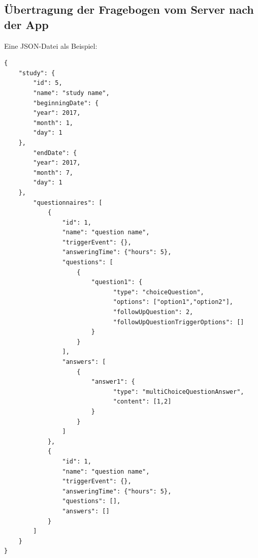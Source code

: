 \documentclass[a4paper]{scrreprt}
\begin{document}
            \subsection{Übertragung der Fragebogen vom Server nach der App}
                Eine JSON-Datei als Beispiel:
                \begin{lstlisting}
{
    "study": {
        "id": 5,
        "name": "study name",
        "beginningDate": {
        "year": 2017,
        "month": 1,
        "day": 1
    },
        "endDate": {
        "year": 2017,
        "month": 7,
        "day": 1
    },
        "questionnaires": [
            {
                "id": 1,
                "name": "question name",
                "triggerEvent": {},
                "answeringTime": {"hours": 5},
                "questions": [
                    {
                        "question1": {
                              "type": "choiceQuestion",
                              "options": ["option1","option2"],
                              "followUpQuestion": 2,
                              "followUpQuestionTriggerOptions": []
                        }
                    }
                ],
                "answers": [
                    {
                        "answer1": {
                              "type": "multiChoiceQuestionAnswer",
                              "content": [1,2]
                        }
                    }
                ]
            },
            {
                "id": 1,
                "name": "question name",
                "triggerEvent": {},
                "answeringTime": {"hours": 5},
                "questions": [],
                "answers": []
            }
        ]
    }
}
            \end{lstlisting}



    \glsaddall
    \printglossary

    \listoffigures
\end{document}
